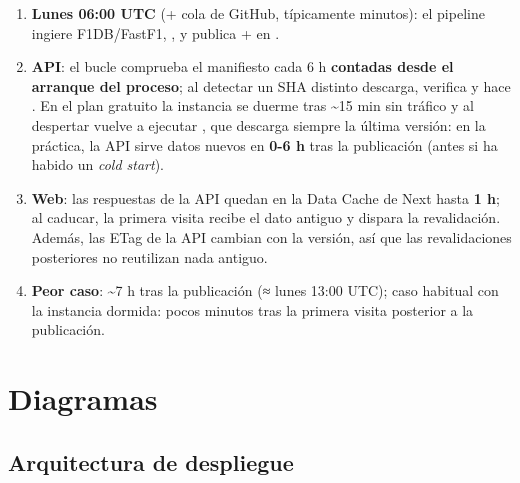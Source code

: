 \begin{enumerate}
\item \textbf{Lunes 06:00 UTC} (+ cola de GitHub, típicamente minutos): el pipeline ingiere F1DB/FastF1, , y publica  +  en .
\item \textbf{API}: el bucle  comprueba el manifiesto cada 6 h \textbf{contadas desde el arranque del proceso}; al detectar un SHA distinto descarga, verifica y hace . En el plan gratuito la instancia se duerme tras \textasciitilde{}15 min sin tráfico y al despertar vuelve a ejecutar , que descarga siempre la última versión: en la práctica, la API sirve datos nuevos en \textbf{0-6 h} tras la publicación (antes si ha habido un \emph{cold start}).
\item \textbf{Web}: las respuestas de la API quedan en la Data Cache de Next hasta \textbf{1 h}; al caducar, la primera visita recibe el dato antiguo y dispara la revalidación. Además, las ETag de la API cambian con la versión, así que las revalidaciones posteriores no reutilizan nada antiguo.
\item \textbf{Peor caso}: \textasciitilde{}7 h tras la publicación (≈ lunes 13:00 UTC); caso habitual con la instancia dormida: pocos minutos tras la primera visita posterior a la publicación.
\end{enumerate}

\section{Diagramas}

\subsection{Arquitectura de despliegue}

